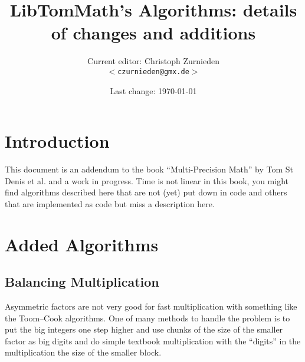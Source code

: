 \documentclass[a4paper,10pt]{report}
\theoremstyle{plain} %
\theoremstyle{definition}
\theoremstyle{remark}
\begin{document}
\title{LibTomMath's Algorithms: details of changes and additions}
\author{Current editor: Christoph Zurnieden\\
        \small{\texttt{$<$czurnieden@gmx.de$>$}}}
\date{Last change: \today}
\maketitle

\tableofcontents
\renewcommand{\ttdefault}{pcr}

\chapter*{Introduction}

This document is an addendum to the book ``Multi-Precision Math'' by Tom St Denis et al.\cite{stmulti} and a work in progress. Time is not linear in this book, you might find algorithms described here that are not (yet) put down in code and others that are implemented as code but miss a description here.

\chapter{Added Algorithms}
\section{Balancing Multiplication}
Asymmetric factors are not very good for fast multiplication with something like the Toom--Cook algorithms. One of many methods to handle the problem is to put the big integers one step higher and use chunks of the size of the smaller factor as big digits and do simple textbook multiplication with the \enquote{digits} in the multiplication the size of the smaller block.
\end{document}
